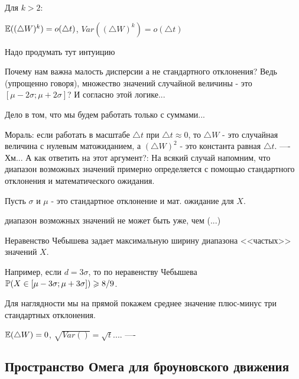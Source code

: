 {Для $k>2$:

$\E((\triangle W)^{k})=o(\triangle t)$, $Var((\triangle W)^{k})=o(\triangle t)$

Надо продумать тут интуицию


Почему нам важна малость дисперсии а не стандартного отклонения? Ведь (упрощенно говоря), множество значений случайной величины - это $[\mu-2\sigma;\mu+2\sigma]$? И согласно этой логике...

Дело в том, что мы будем работать только с суммами...


Мораль: если работать в масштабе $\triangle t$ при $\triangle t \approx 0$, то $\triangle W$ - это случайная величина с нулевым матожиданием, а $(\triangle W)^{2}$ - это константа равная $\triangle t$.
----
Хм... А как ответить на этот аргумент?:
На всякий случай напомним, что диапазон возможных значений примерно определяется с помощью стандартного отклонения и математического ожидания.

Пусть $\sigma$ и $\mu$ - это стандартное отклонение и мат. ожидание для $X$.

диапазон возможных значений не может быть уже, чем (...)

Неравенство Чебышева задает максимальную ширину диапазона <<частых>> значений $X$.

Например, если $d=3\sigma$, то по неравенству Чебышева $\P(X\in[\mu-3\sigma;\mu+3\sigma])\geq 8/9$.

Для наглядности мы на прямой покажем среднее значение плюс-минус три стандартных отклонения.

$\E(\triangle W)=0$, $\sqrt{Var()}=\sqrt{t}$....
----




}\subsection{Пространство Омега для броуновского движения}  
